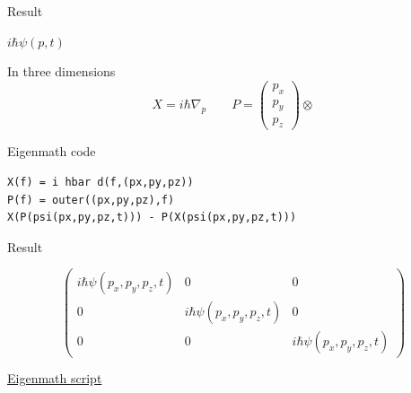 Result

\bigskip
$i\hbar\psi(p,t)$

\bigskip
In three dimensions
\begin{equation*}
X=i\hbar\nabla_p
\qquad
P=\begin{pmatrix}p_x\\p_y\\p_z\end{pmatrix}\otimes
\end{equation*}

Eigenmath code
{\color{blue}
\begin{verbatim}
X(f) = i hbar d(f,(px,py,pz))
P(f) = outer((px,py,pz),f)
X(P(psi(px,py,pz,t))) - P(X(psi(px,py,pz,t)))
\end{verbatim}}

Result

\begin{equation*}
\begin{pmatrix}
i\hbar\psi(p_x,p_y,p_z,t)&0&0\\[1ex]
0&i\hbar\psi(p_x,p_y,p_z,t)&0\\[1ex]
0&0&i\hbar\psi(p_x,p_y,p_z,t)
\end{pmatrix}
\end{equation*}

\bigskip
\href{https://georgeweigt.github.io/examples/canonical-commutation-relation-demo.html}{Eigenmath script}


